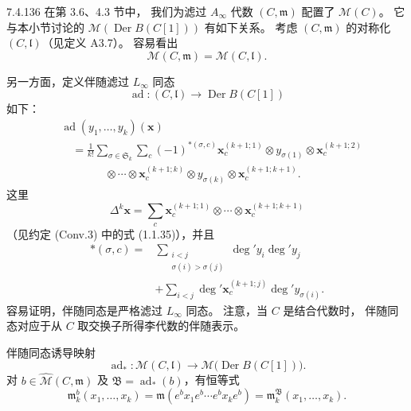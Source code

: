 \begin{remark}{7.4.136}\label{rem:7-4-136}
在第 3.6、4.3 节中，
我们为滤过 $A_\infty$ 代数
$(C,\mathfrak m)$ 配置了 $\mathcal M(C)$。
它与本小节讨论的
$\mathcal M(\operatorname{Der}B(C[1]))$
有如下关系。
考虑 $(C,\mathfrak m)$ 的对称化
$(C,\mathfrak l)$（见定义 A3.7）。
容易看出
\[
\mathcal M(C,\mathfrak m)
=\mathcal M(C,\mathfrak l).
\]

另一方面，定义伴随滤过 $L_\infty$ 同态
\[
\operatorname{ad}\colon
(C,\mathfrak l)
\longrightarrow
\operatorname{Der}B(C[1])
\]
如下：
\begin{equation}
\begin{aligned}
&\operatorname{ad}(y_1,\ldots,y_k)(\mathbf x)\\
&\quad=
\frac{1}{k!}
\sum_{\sigma\in\mathfrak S_k}\sum_c
(-1)^{*(\sigma,c)}
\mathbf x_c^{(k+1;1)}
\otimes y_{\sigma(1)}
\otimes\mathbf x_c^{(k+1;2)}\\
&\qquad\qquad\otimes\cdots\otimes
\mathbf x_c^{(k+1;k)}
\otimes y_{\sigma(k)}
\otimes\mathbf x_c^{(k+1;k+1)}.
\end{aligned}
\tag{7.4.137}\label{eq:7-4-137}
\end{equation}
这里
\[
\Delta^k\mathbf x
=\sum_c
\mathbf x_c^{(k+1;1)}\otimes\cdots\otimes
\mathbf x_c^{(k+1;k+1)}
\]
（见约定 (Conv.3) 中的式 (1.1.35)），并且
\[
\begin{aligned}
*(\sigma,c)
={}&
\sum_{\substack{i<j\\\sigma(i)>\sigma(j)}}
\deg' y_i\deg' y_j\\
&+
\sum_{i<j}
\deg'\mathbf x_c^{(k+1;j)}
\deg' y_{\sigma(i)}.
\end{aligned}
\]
容易证明，伴随同态是严格滤过 $L_\infty$ 同态。
注意，当 $C$ 是结合代数时，
伴随同态对应于从 $C$ 取交换子所得李代数的伴随表示。

伴随同态诱导映射
\[
\operatorname{ad}_*\colon
\mathcal M(C,\mathfrak l)
\longrightarrow
\mathcal M\bigl(\operatorname{Der}B(C[1])\bigr).
\]
对
$b\in\widehat{\mathcal M}(C,\mathfrak m)$
及 $\mathfrak B=\operatorname{ad}_*(b)$，有恒等式
\[
\mathfrak m_k^b(x_1,\ldots,x_k)
=\mathfrak m(e^bx_1e^b\cdots e^bx_ke^b)
=\mathfrak m_k^{\mathfrak B}(x_1,\ldots,x_k).
\]
\end{remark}
